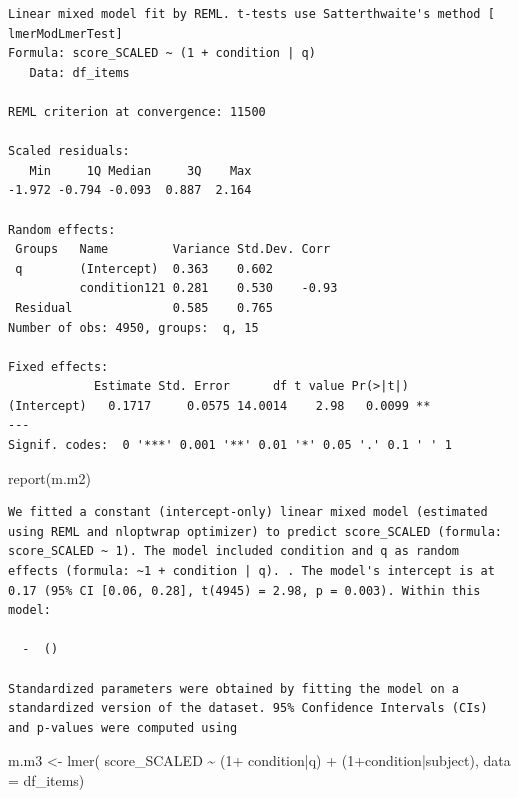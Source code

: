 \documentclass[
  letterpaper,
  DIV=11,
  numbers=noendperiod]{scrreprt}
\newenvironment{Shaded}{\begin{snugshade}}{\end{snugshade}}
\newcommand{\AttributeTok}[1]{\textcolor[rgb]{0.40,0.45,0.13}{#1}}
\newcommand{\DecValTok}[1]{\textcolor[rgb]{0.68,0.00,0.00}{#1}}
\newcommand{\FunctionTok}[1]{\textcolor[rgb]{0.28,0.35,0.67}{#1}}
\newcommand{\NormalTok}[1]{\textcolor[rgb]{0.00,0.23,0.31}{#1}}
\newcommand{\OtherTok}[1]{\textcolor[rgb]{0.00,0.23,0.31}{#1}}
\newcommand{\SpecialCharTok}[1]{\textcolor[rgb]{0.37,0.37,0.37}{#1}}
\begin{document}
\begin{verbatim}
Linear mixed model fit by REML. t-tests use Satterthwaite's method [
lmerModLmerTest]
Formula: score_SCALED ~ (1 + condition | q)
   Data: df_items

REML criterion at convergence: 11500

Scaled residuals: 
   Min     1Q Median     3Q    Max 
-1.972 -0.794 -0.093  0.887  2.164 

Random effects:
 Groups   Name         Variance Std.Dev. Corr 
 q        (Intercept)  0.363    0.602         
          condition121 0.281    0.530    -0.93
 Residual              0.585    0.765         
Number of obs: 4950, groups:  q, 15

Fixed effects:
            Estimate Std. Error      df t value Pr(>|t|)   
(Intercept)   0.1717     0.0575 14.0014    2.98   0.0099 **
---
Signif. codes:  0 '***' 0.001 '**' 0.01 '*' 0.05 '.' 0.1 ' ' 1
\end{verbatim}

\begin{Shaded}
\begin{Highlighting}[]
\FunctionTok{report}\NormalTok{(m.m2)}
\end{Highlighting}
\end{Shaded}

\begin{verbatim}
We fitted a constant (intercept-only) linear mixed model (estimated using REML and nloptwrap optimizer) to predict score_SCALED (formula: score_SCALED ~ 1). The model included condition and q as random effects (formula: ~1 + condition | q). . The model's intercept is at 0.17 (95% CI [0.06, 0.28], t(4945) = 2.98, p = 0.003). Within this model:

  -  ()

Standardized parameters were obtained by fitting the model on a standardized version of the dataset. 95% Confidence Intervals (CIs) and p-values were computed using 
\end{verbatim}

\begin{Shaded}
\begin{Highlighting}[]
\NormalTok{m.m3 }\OtherTok{\textless{}{-}} \FunctionTok{lmer}\NormalTok{( score\_SCALED }\SpecialCharTok{\textasciitilde{}}\NormalTok{ (}\DecValTok{1}\SpecialCharTok{+}\NormalTok{ condition}\SpecialCharTok{|}\NormalTok{q) }\SpecialCharTok{+}\NormalTok{ (}\DecValTok{1}\SpecialCharTok{+}\NormalTok{condition}\SpecialCharTok{|}\NormalTok{subject), }\AttributeTok{data =}\NormalTok{ df\_items)}
\end{Highlighting}
\end{Shaded}
\end{document}
